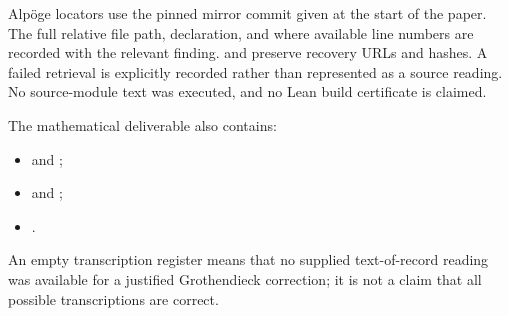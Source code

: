 Alp\"oge locators use the pinned mirror commit given at the start
of the paper. The full relative file path, declaration, and where
available line numbers are recorded with the relevant finding.
 and
 preserve recovery
URLs and hashes. A failed retrieval is explicitly recorded rather
than represented as a source reading. No source-module text was
executed, and no Lean build certificate is claimed.

The mathematical deliverable also contains:
\begin{itemize}[leftmargin=*]
\item {} and ;
\item {} and ;
\item {}.
\end{itemize}
An empty transcription register means that no
supplied text-of-record reading was available for a justified
Grothendieck correction; it is not a claim that all possible
transcriptions are correct.
